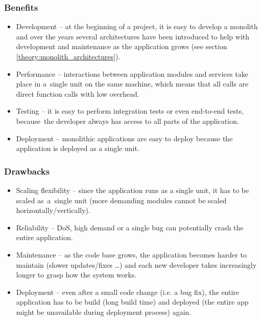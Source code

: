 \subsubsection{Benefits}
\begin{itemize}
    \item Development -- at the beginning of a project, it is easy to develop a monolith and over the years several architectures have been introduced to help with development and maintenance as the application grows (see section \ref{theory:monolith_architectures}).
    
    \item Performance -- interactions between application modules and services take place in a~single unit on the same machine, which means that all calls are direct function calls with low overhead.
    
    \item Testing -- it is easy to perform integration tests or even end-to-end tests, because~the developer always has access to all parts of the application. 
    
    \item Deployment -- monolithic applications are easy to deploy because the application is deployed as a single unit.
\end{itemize}

\subsubsection{Drawbacks}
\begin{itemize}
    \item Scaling flexibility -- since the application runs as a single unit, it has to be scaled as~a~single unit (more demanding modules cannot be scaled horizontally/vertically).
    
    \item Reliability -- DoS, high demand or a single bug can potentially crash the entire application.
    
    \item Maintenance -- as the code base grows, the application becomes harder to maintain (slower updates/fixes \dots) and each new developer takes increasingly longer to grasp how the system works.
    
    \item Deployment -- even after a small code change (i.e. a bug fix), the entire application has to be build (long build time) and deployed (the entire app might be unavailable during deployment process) again.
\end{itemize}


